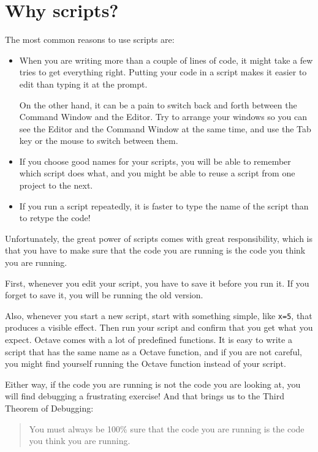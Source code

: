 \documentclass{book}
\begin{document}
\section{Why scripts?}

The most common reasons to use scripts are:

\begin{itemize}

\item When you are writing more than a couple of lines of code, it
might take a few tries to get everything right. Putting your code
in a script makes it easier to edit than typing it at the prompt.

On the other hand, it can be a pain to switch back and forth between
the Command Window and the Editor. Try to arrange your windows so
you can see the Editor and the Command Window at the same time, and
use the Tab key or the mouse to switch between them.

\item If you choose good names for your scripts, you will be able
to remember which script does what, and you might be able to reuse
a script from one project to the next.

\item If you run a script repeatedly, it is faster to type the
name of the script than to retype the code!

\end{itemize}

Unfortunately, the great power of scripts comes with great responsibility,
which is that you have to make sure that the code you are running is
the code you think you are running.

First, whenever you edit your script, you have to save it before you
run it. If you forget to save it, you will be running the old version.

Also, whenever you start a new script, start with something simple,
like {\tt x=5}, that produces a visible effect. Then run your script
and confirm that you get what you expect. Octave comes with a lot of
predefined functions. It is easy to write a script that has the same
name as a Octave function, and if you are not careful, you might
find yourself running the Octave function instead of your script.

Either way, if the code you are running is not the code you are looking
at, you will find debugging a frustrating exercise! And that brings
us to the Third Theorem of Debugging:

\begin{quote}
You must always be 100\% sure that the code you are running is
the code you think you are running.
\end{quote}
\end{document}
